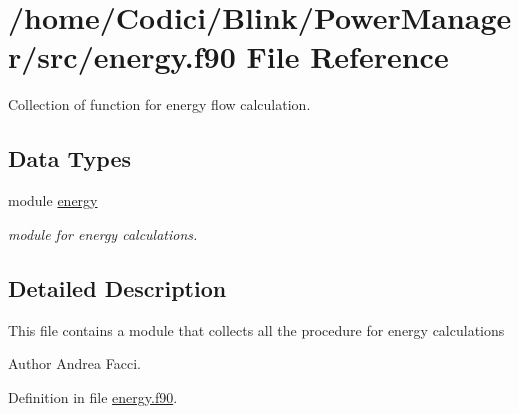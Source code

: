 \hypertarget{energy_8f90}{\section{/home/\-Codici/\-Blink/\-Power\-Manager/src/energy.f90 File Reference}
\label{energy_8f90}
}


Collection of function for energy flow calculation.  


\subsection*{Data Types}
\begin{DoxyCompactItemize}
\item 
module \hyperlink{classenergy}{energy}
\begin{DoxyCompactList}\small\item\em module for energy calculations. \end{DoxyCompactList}\end{DoxyCompactItemize}


\subsection{Detailed Description}
This file contains a module that collects all the procedure for energy calculations \begin{DoxyAuthor}{Author}
Andrea Facci. 
\end{DoxyAuthor}


Definition in file \hyperlink{energy_8f90_source}{energy.\-f90}.

